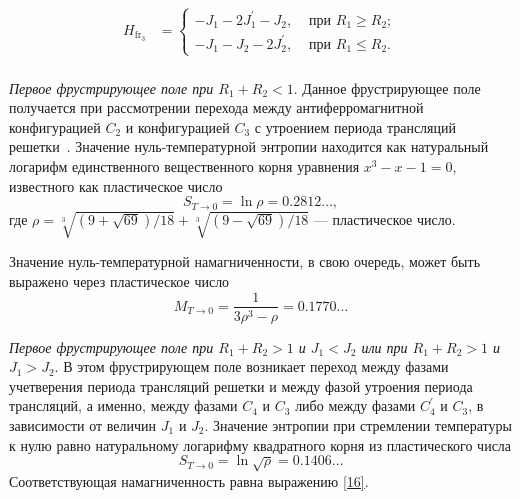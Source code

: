 \[
\begin{aligned}
H_{\text{fr$_3$}}&=
\begin{cases}
-J_1-2J_1^{'}-J_2, & \text{ при }  R_1\ge R_2; \\
-J_1-J_2-2J_2^{'},   & \text{ при }  R_1 \leq R_2.
\end{cases}\\
\end{aligned}
\]

\emph{Первое фрустрирующее поле при $R_1 + R_2 < 1$}. Данное фрустрирующее поле получается при рассмотрении перехода между антиферромагнитной конфигурацией $C_2$ и конфигурацией $C_3$ с утроением периода трансляций решетки~\cite{zarubin2019}. Значение нуль-температурной энтропии находится как натуральный логарифм единственного вещественного корня уравнения \mbox{$x^3-x-1=0$}, известного как пластическое число
\begin{equation}
S_{T\rightarrow 0} = \ln \rho = 0.2812\dots,
\label{15}
\end{equation}
где $\rho = \sqrt[3]{(9+\sqrt{69})/18}+\sqrt[3]{(9-\sqrt{69})/18}$ --- пластическое число.

Значение нуль-температурной намагниченности, в свою очередь, может быть выражено через пластическое число
\begin{equation}
M_{T\rightarrow 0} = \frac{1}{3\rho^3-\rho} = 0.1770\dots
\label{16}
\end{equation}


\emph{Первое фрустрирующее поле при $R_1 + R_2 > 1$ и $J_1 < J_2$ или при $R_1 + R_2 > 1$ и $J_1 > J_2$}. В этом фрустрирующем поле возникает переход между фазами учетверения периода трансляций решетки и между фазой утроения периода трансляций, а именно, между фазами $C_4$ и $C_3$ либо между
фазами $C_4^{'}$ и $C_3$, в зависимости от величин $J_1$ и $J_2$. Значение энтропии при стремлении температуры к нулю равно натуральному логарифму квадратного корня из пластического числа
\begin{equation}
S_{T\rightarrow 0} = \ln \sqrt{\rho} = 0.1406\dots
\label{17}
\end{equation}
Соответствующая намагниченность равна выражению \eqref{16}.

